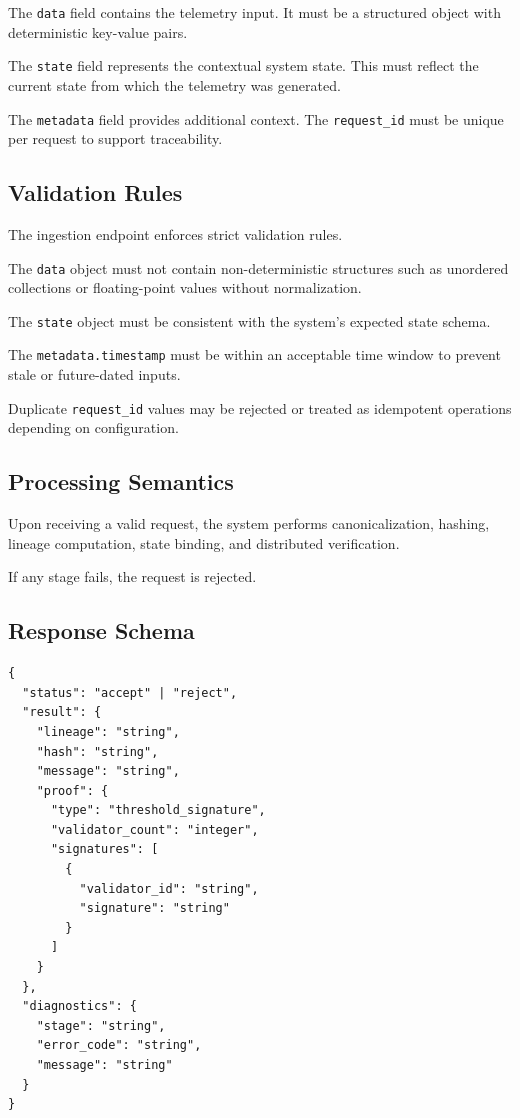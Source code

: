 The \texttt{data} field contains the telemetry input. It must be a structured object with deterministic key-value pairs.

The \texttt{state} field represents the contextual system state. This must reflect the current state from which the telemetry was generated.

The \texttt{metadata} field provides additional context. The \texttt{request\_id} must be unique per request to support traceability.

\subsection{Validation Rules}

The ingestion endpoint enforces strict validation rules.

The \texttt{data} object must not contain non-deterministic structures such as unordered collections or floating-point values without normalization.

The \texttt{state} object must be consistent with the system’s expected state schema.

The \texttt{metadata.timestamp} must be within an acceptable time window to prevent stale or future-dated inputs.

Duplicate \texttt{request\_id} values may be rejected or treated as idempotent operations depending on configuration.

\subsection{Processing Semantics}

Upon receiving a valid request, the system performs canonicalization, hashing, lineage computation, state binding, and distributed verification.

If any stage fails, the request is rejected.

\subsection{Response Schema}

\begin{verbatim}
{
  "status": "accept" | "reject",
  "result": {
    "lineage": "string",
    "hash": "string",
    "message": "string",
    "proof": {
      "type": "threshold_signature",
      "validator_count": "integer",
      "signatures": [
        {
          "validator_id": "string",
          "signature": "string"
        }
      ]
    }
  },
  "diagnostics": {
    "stage": "string",
    "error_code": "string",
    "message": "string"
  }
}
\end{verbatim}

